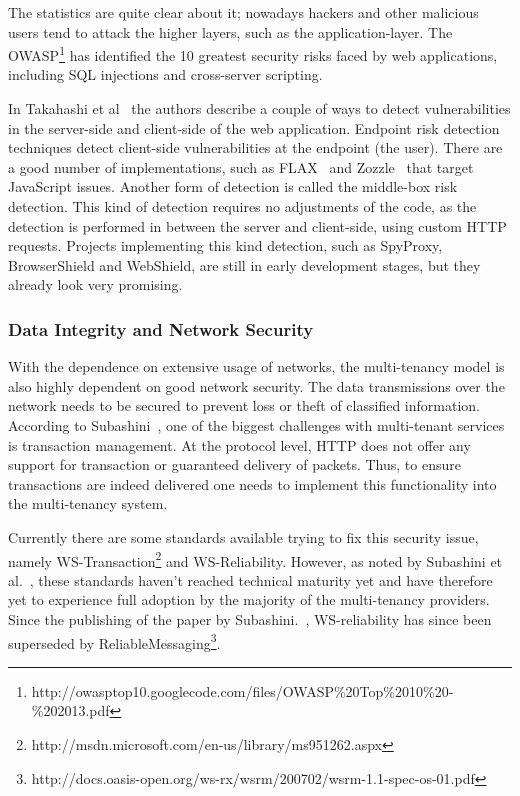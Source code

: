 The statistics are quite clear about it; nowadays hackers and other malicious users tend to attack the higher layers, such as the application-layer. 
The \ac{OWASP}\footnote{http://owasptop10.googlecode.com/files/OWASP\%20Top\%2010\%20-\%202013.pdf} has identified the 10 greatest security risks faced by web applications, including SQL injections and cross-server scripting.

In Takahashi et al~\cite{Takahashi2012Security} the authors describe a couple of ways to detect vulnerabilities in the server-side and client-side of the web application. 
Endpoint risk detection techniques detect client-side vulnerabilities at the endpoint (the user). 
There are a good number of implementations, such as FLAX~\cite{saxena10kudzu} and Zozzle~\cite{curtsinger2011zozzle} that target JavaScript issues. 
Another form of detection is called the middle-box risk detection. 
This kind of detection requires no adjustments of the code, as the detection is performed in between the server and client-side, using custom HTTP requests. 
Projects implementing this kind detection, such as SpyProxy, BrowserShield and WebShield, are still in early development stages, but they already look very promising.

\subsubsection{Data Integrity and Network Security}
With the dependence on extensive usage of networks, the multi-tenancy model is also highly dependent on good network security.  
The data transmissions over the network needs to be secured to prevent loss or theft of classified information. 
According to Subashini~\cite{Subashini2011Security}, one of the biggest challenges with multi-tenant services is transaction management. 
At the protocol level, HTTP does not offer any support for transaction or guaranteed delivery of packets. 
Thus, to ensure transactions are indeed delivered one needs to implement this functionality into the multi-tenancy system.

Currently there are some standards available trying to fix this security issue, namely WS-Transaction\footnote{http://msdn.microsoft.com/en-us/library/ms951262.aspx} and WS-Reliability.
However, as noted by Subashini et al.~\cite{Subashini2011Security}, these standards haven’t reached technical maturity yet and have therefore yet to experience full adoption by the majority of the multi-tenancy providers.
Since the publishing of the paper by Subashini.~\cite{Subashini2011Security}, WS-reliability has since been superseded by ReliableMessaging\footnote{http://docs.oasis-open.org/ws-rx/wsrm/200702/wsrm-1.1-spec-os-01.pdf}.

